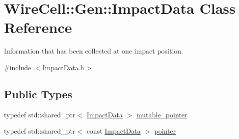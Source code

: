 \hypertarget{class_wire_cell_1_1_gen_1_1_impact_data}{}\section{Wire\+Cell\+:\+:Gen\+:\+:Impact\+Data Class Reference}
\label{class_wire_cell_1_1_gen_1_1_impact_data}


Information that has been collected at one impact position.  




{\ttfamily \#include $<$Impact\+Data.\+h$>$}

\subsection*{Public Types}
\begin{DoxyCompactItemize}
\item 
typedef std\+::shared\+\_\+ptr$<$ \hyperlink{class_wire_cell_1_1_gen_1_1_impact_data}{Impact\+Data} $>$ \hyperlink{class_wire_cell_1_1_gen_1_1_impact_data_a6a085b06dc01a1c1b1cd44fb4a034f83}{mutable\+\_\+pointer}
\item 
typedef std\+::shared\+\_\+ptr$<$ const \hyperlink{class_wire_cell_1_1_gen_1_1_impact_data}{Impact\+Data} $>$ \hyperlink{class_wire_cell_1_1_gen_1_1_impact_data_a4fb9b565e1525c7ccde05ded67f467c2}{pointer}
\end{DoxyCompactItemize}
